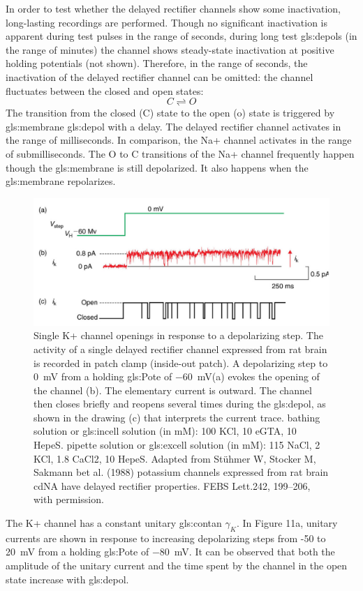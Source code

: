 \documentclass[class={myRUCProject}, crop=false]{standalone}
\begin{document}
In order to test whether the delayed rectifier channels show some inactivation, long-lasting recordings are performed. Though no significant inactivation is apparent during test pulses in the range of seconds, during long test \glspl{gls:depol} (in the range of minutes) the channel shows steady-state inactivation at positive holding potentials (not shown). Therefore, in the range of seconds, the inactivation of the delayed rectifier channel can be omitted: the channel fluctuates between the closed and open states:
\[C\rightleftharpoons O\]
The transition from the closed (C) state to the open (o) state is triggered by \gls{gls:membrane} \gls{gls:depol} with a delay. The delayed rectifier channel activates in the range of milliseconds. In comparison, the Na+ channel activates in the range of submilliseconds. The O to C transitions of the Na+ channel frequently happen though the \gls{gls:membrane} is still depolarized. It also happens when the \gls{gls:membrane} repolarizes. 
  \begin{figure}[H]
      \centering
      \includegraphics[width=0.5\linewidth]{Pictures//Anakin/K+channel.png}
      \caption{Single K+ channel openings in response to a depolarizing step. The activity of a single delayed rectifier channel expressed from rat brain is recorded in patch clamp (inside-out patch). A depolarizing step to \qty{0}{\mV} from a holding \gls{gls:Pote} of \qty{-60}{\mV}(a) evokes the opening of the channel (b). The elementary current is outward. The channel then closes briefly and reopens several times during the \gls{gls:depol}, as shown in the drawing (c) that interprets the current trace. bathing solution or \gls{gls:incell} solution (in mM): 100 KCl, 10 eGTA, 10 HepeS. pipette solution or \gls{gls:excell} solution (in mM): 115 NaCl, 2 KCl, 1.8 CaCl2, 10 HepeS. Adapted from Stühmer W, Stocker M, Sakmann bet al. (1988) potassium channels expressed from rat brain cdNA have delayed rectifier properties. FEBS Lett.242, 199–206, with permission. }
      \label{fig:enter-label}
  \end{figure}

The K+ channel has a constant unitary \gls{gls:contan} \(\gamma_K\). In Figure 11a, unitary currents are shown in response to increasing depolarizing steps from -50 to \qty{20}{\mV} from a holding \gls{gls:Pote} of \qty{-80}{\mV}. It can be observed that both the amplitude of the unitary current and the time spent by the channel in the open state increase with \gls{gls:depol}. 
\end{document}
